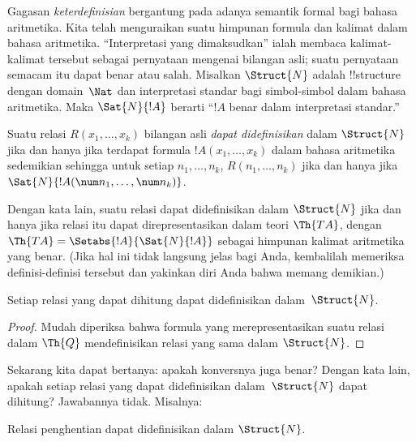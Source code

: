 \documentclass[../../../include/open-logic-section]{subfiles}
\begin{document}


Gagasan \emph{keterdefinisian} bergantung pada adanya semantik formal bagi
bahasa aritmetika. Kita telah menguraikan suatu himpunan formula dan kalimat
dalam bahasa aritmetika. ``Interpretasi yang dimaksudkan'' ialah membaca
kalimat-kalimat tersebut sebagai pernyataan mengenai bilangan asli; suatu
pernyataan semacam itu dapat benar atau salah. Misalkan $\Struct{N}$ adalah
!!{structure} dengan domain~$\Nat$ dan interpretasi standar bagi simbol-simbol
dalam bahasa aritmetika. Maka $\Sat{N}{!A}$ berarti ``$!A$ benar dalam
interpretasi standar.''

\begin{defn}
Suatu relasi $R(x_1,\dots,x_k)$ bilangan asli \emph{dapat didefinisikan}
dalam $\Struct{N}$ jika dan hanya jika terdapat formula
$!A(x_1,\dots,x_k)$ dalam bahasa aritmetika sedemikian sehingga untuk setiap
$n_1,\dots,n_k$, $R(n_1,\dots,n_k)$ jika dan hanya jika
$\Sat{N}{!A(\num n_1,\dots,\num n_k)}$.
\end{defn}

Dengan kata lain, suatu relasi dapat didefinisikan dalam $\Struct{N}$ jika
dan hanya jika relasi itu dapat direpresentasikan dalam teori $\Th{TA}$,
dengan $\Th{TA} = \Setabs{!A}{\Sat{N}{!A}}$ sebagai himpunan kalimat
aritmetika yang benar. (Jika hal ini tidak langsung jelas bagi Anda,
kembalilah memeriksa definisi-definisi tersebut dan yakinkan diri Anda bahwa
memang demikian.)

\begin{lem}
Setiap relasi yang dapat dihitung dapat didefinisikan dalam~$\Struct{N}$.
\end{lem}

\begin{proof}
Mudah diperiksa bahwa formula yang merepresentasikan suatu relasi dalam
$\Th{Q}$ mendefinisikan relasi yang sama dalam $\Struct{N}$.
\end{proof}

Sekarang kita dapat bertanya: apakah konversnya juga benar? Dengan kata lain,
apakah setiap relasi yang dapat didefinisikan dalam~$\Struct{N}$ dapat
dihitung? Jawabannya tidak. Misalnya:

\begin{lem}
Relasi penghentian dapat didefinisikan dalam $\Struct{N}$.
\end{lem}
\end{document}
